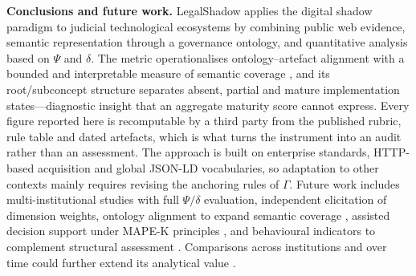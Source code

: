 \documentclass[engproc,proceedingpaper,submit,moreauthors]{Definitions/mdpi}
\begin{document}
\textbf{Conclusions and future work.}
    LegalShadow applies the digital shadow paradigm to judicial technological ecosystems by combining public web evidence, semantic representation through a governance ontology, and quantitative analysis based on $\Psi$ and $\delta$. The metric operationalises ontology--artefact alignment with a bounded and interpretable measure of semantic coverage \cite{Karabulut2024}, and its root/subconcept structure separates absent, partial and mature implementation states---diagnostic insight that an aggregate maturity score cannot express. Every figure reported here is recomputable by a third party from the published rubric, rule table and dated artefacts, which is what turns the instrument into an audit rather than an assessment. The approach is built on enterprise standards, HTTP-based acquisition and global JSON-LD vocabularies, so adaptation to other contexts mainly requires revising the anchoring rules of $\Gamma$. Future work includes multi-institutional studies with full $\Psi/\delta$ evaluation, independent elicitation of dimension weights, ontology alignment to expand semantic coverage \cite{Hogan2021}, assisted decision support under MAPE-K principles \cite{Kephart2003}, and behavioural indicators to complement structural assessment \cite{Medvedeva2020}. Comparisons across institutions and over time could further extend its analytical value \cite{Shahat2021,Haraguchi2024}.
\end{document}
